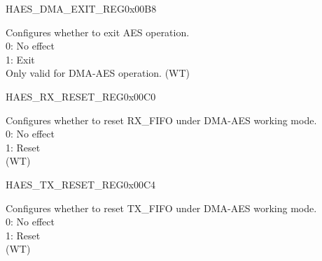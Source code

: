 \begin{register}{H}{AES\_DMA\_EXIT\_REG}{0x00B8}\label{regdesc:AESDMAEXITREG}
%
%
\regnewline%
\begin{regdesc}\begin{reglist}
\label{fielddesc:AESDMAEXIT}\item [AES\_DMA\_EXIT] Configures whether to exit AES operation. \\
0: No effect\\
1: Exit\\
Only valid for DMA-AES operation. (WT)
\end{reglist}\end{regdesc}
\end{register}


\begin{register}{H}{AES\_RX\_RESET\_REG}{0x00C0}\label{regdesc:AESRXRESETREG}
%
%
\regnewline%
\begin{regdesc}\begin{reglist}
\label{fielddesc:AESRXRESET}\item [AES\_RX\_RESET] Configures whether to reset RX\_FIFO under DMA-AES working mode. \\
0: No effect\\
1: Reset \\
(WT)\\
\end{reglist}\end{regdesc}
\end{register}


\begin{register}{H}{AES\_TX\_RESET\_REG}{0x00C4}\label{regdesc:AESTXRESETREG}
%
%
\regnewline%
\begin{regdesc}\begin{reglist}
\label{fielddesc:AESTXRESET}\item [AES\_TX\_RESET] Configures whether to reset TX\_FIFO under DMA-AES working mode. \\
0: No effect\\
1: Reset \\
(WT)\\
\end{reglist}\end{regdesc}
\end{register}


